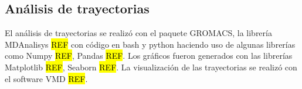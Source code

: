 


\subsection{Análisis de trayectorias}

El análisis de trayectorias se realizó con el paquete GROMACS, la librería MDAnalisys \hl{REF} con código en bash y python haciendo uso de algunas librerías como Numpy \hl{REF}, Pandas \hl{REF}. Los gráficos fueron generados con las librerías Matplotlib \hl{REF}, Seaborn \hl{REF}. La visualización de las trayectorias se realizó con el software VMD \hl{REF}.
